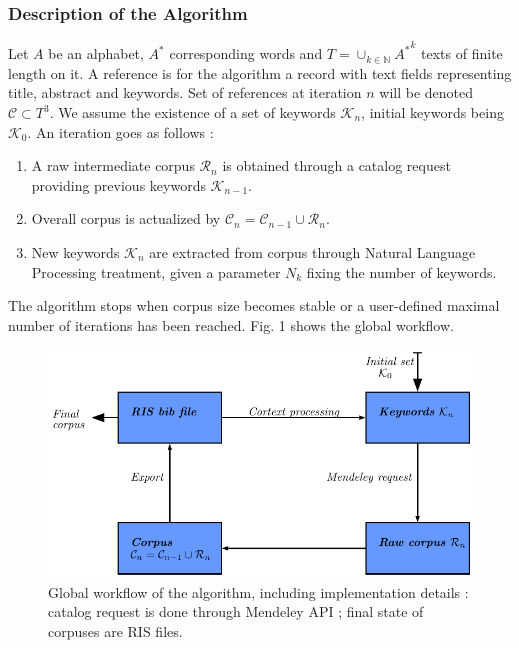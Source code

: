\subsubsection{Description of the Algorithm}

Let $A$ be an alphabet, $A^{\ast}$ corresponding words and $T = \cup_{k\in \mathbb{N}} {A^{\ast}}^k$ texts of finite length on it. A reference is for the algorithm a record with text fields representing title, abstract and keywords. Set of references at iteration $n$ will be denoted $\mathcal{C} \subset T^3$. We assume the existence of a set of keywords $\mathcal{K}_n$, initial keywords being $\mathcal{K}_0$. An iteration goes as follows :

\begin{enumerate}
\item A raw intermediate corpus $\mathcal{R}_n$ is obtained through a catalog request providing previous keywords $\mathcal{K}_{n-1}$.
\item Overall corpus is actualized by $\mathcal{C}_n = \mathcal{C}_{n-1} \cup \mathcal{R}_n$.
\item New keywords $\mathcal{K}_n$ are extracted from corpus through Natural Language Processing treatment, given a parameter $N_k$ fixing the number of keywords.
\end{enumerate}

The algorithm stops when corpus size becomes stable or a user-defined maximal number of iterations has been reached. Fig. 1 shows the global workflow.



\begin{figure}
\centering
\includegraphics[width=\textwidth]{Figures/PartI/QuantitativeEpistemo/schema_algo}
\caption[Systematic review algorithm workflow]{Global workflow of the algorithm, including implementation details : catalog request is done through Mendeley API ; final state of corpuses are RIS files.}
\label{fig:quantepistemo:algo}
\end{figure}



